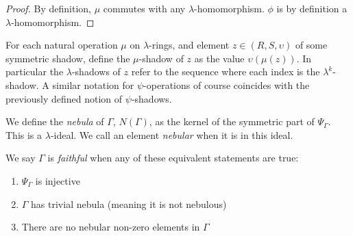 \begin{proof}
  By definition, $\mu$ commutes with any $\lambda$-homomorphism. $\phi$ is by definition a $\lambda$-homomorphism. \qedhere
\end{proof}

\begin{definition}
  For each natural operation $\mu$ on $\lambda$-rings, and element $z \in (R, S, \upsilon)$ of some symmetric shadow, define the $\mu$-shadow of $z$ as the value $\upsilon(\mu(z))$. In particular the $\lambda$-shadows of $z$ refer to the sequence where each index is the $\lambda^k$-shadow. A similar notation for $\psi$-operations of course coincides with the previously defined notion of $\psi$-shadows.
\end{definition}


  


\begin{definition}
  We define the \emph{nebula} of $\Gamma$, $N(\Gamma)$, as the kernel of the symmetric part of $\Psi_\Gamma$. This is a $\lambda$-ideal. We call an element \emph{nebular} when it is in this ideal.
\end{definition}

\begin{propdef}
  We say $\Gamma$ is \emph{faithful} when any of these equivalent statements are true:
  \begin{enumerate}
    \item $\Psi_\Gamma$ is injective
    \item $\Gamma$ has trivial nebula (meaning it is not nebulous)
    \item There are no nebular non-zero elements in $\Gamma$
  \end{enumerate}
\end{propdef}

